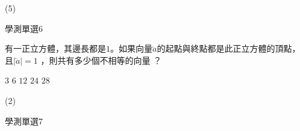 \begin{QUESTIONS}
\begin{QUESTION}
\begin{QBODY}
        \end{QBODY}
        \begin{QFROMS}
        \end{QFROMS}
        \begin{QTAGS}\end{QTAGS}
        \begin{QANS}
            (5)
        \end{QANS}
        \begin{QSOLLIST}
        \end{QSOLLIST}
        \begin{QEMPTYSPACE}
        \end{QEMPTYSPACE}
    \end{QUESTION}
    \begin{QUESTION}
        \begin{ExamInfo}{86}{學測}{單選}{6}
        \end{ExamInfo}
        \begin{ExamAnsRateInfo}{}{}{}{}
        \end{ExamAnsRateInfo}
        \begin{QBODY}
            有一正立方體，其邊長都是$1$。如果向量$\lvec{a}$的起點與終點都是此正立方體的頂點，且$\left|\lvec{a}\right|=1$ ，則共有多少個不相等的向量 ？
            \begin{QOPS}
                \QOP $3$	
                \QOP $6$
                \QOP $12$	
                \QOP $24$
                \QOP $28$                
            \end{QOPS}
        \end{QBODY}
        \begin{QFROMS}
        \end{QFROMS}
        \begin{QTAGS}\end{QTAGS}
        \begin{QANS}
            (2)
        \end{QANS}
        \begin{QSOLLIST}
        \end{QSOLLIST}
        \begin{QEMPTYSPACE}
        \end{QEMPTYSPACE}
    \end{QUESTION}
    \begin{QUESTION}
        \begin{ExamInfo}{86}{學測}{單選}{7}
        \end{ExamInfo}
        \begin{ExamAnsRateInfo}{}{}{}{}

\end{ExamAnsRateInfo}
\end{QUESTION}
\end{QUESTIONS}
